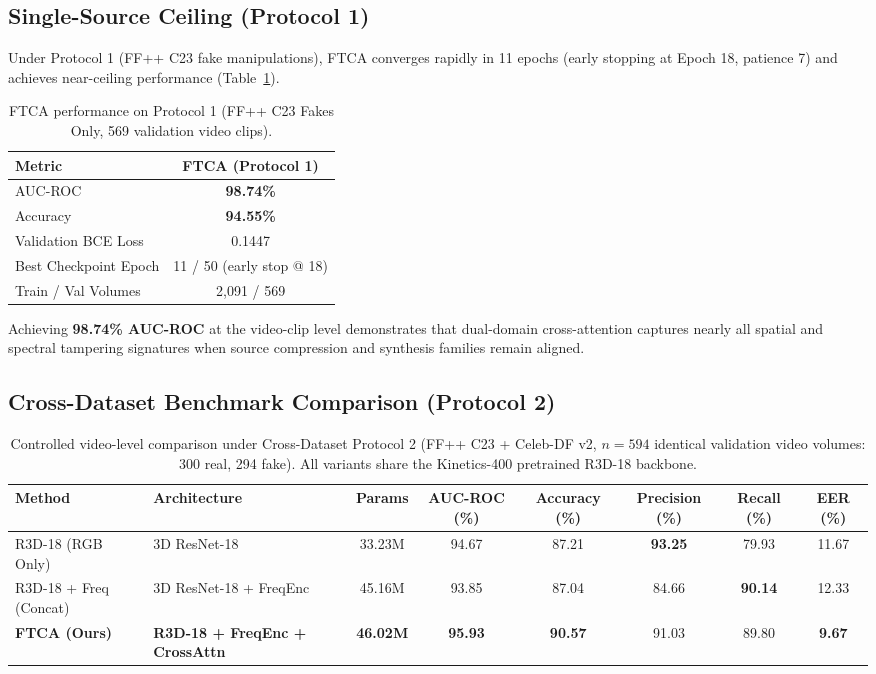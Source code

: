 \documentclass[conference,10pt]{IEEEtran}
\begin{document}
\subsection{Single-Source Ceiling (Protocol 1)}
Under Protocol 1 (FF++ C23 fake manipulations), FTCA converges rapidly in 11 epochs (early stopping at Epoch 18, patience 7) and achieves near-ceiling performance (Table~\ref{tab:single}).

\begin{table}[h]
\centering
\caption{FTCA performance on Protocol 1 (FF++ C23 Fakes Only, 569 validation video clips).}
\label{tab:single}
\begin{tabular}{lc}
\toprule
\textbf{Metric} & \textbf{FTCA (Protocol 1)} \\
\midrule
AUC-ROC & \textbf{98.74\%} \\
Accuracy & \textbf{94.55\%} \\
Validation BCE Loss & 0.1447 \\
Best Checkpoint Epoch & 11 / 50 (early stop @ 18) \\
Train / Val Volumes & 2,091 / 569 \\
\bottomrule
\end{tabular}
\end{table}

\noindent Achieving \textbf{98.74\% AUC-ROC} at the video-clip level demonstrates that dual-domain cross-attention captures nearly all spatial and spectral tampering signatures when source compression and synthesis families remain aligned.

\subsection{Cross-Dataset Benchmark Comparison (Protocol 2)}

\begin{table}[t]
\centering
\caption{Controlled video-level comparison under Cross-Dataset Protocol 2 (FF++ C23 + Celeb-DF v2, $n=594$ identical validation video volumes: 300 real, 294 fake). All variants share the Kinetics-400 pretrained R3D-18 backbone.}
\label{tab:cross}
{\setlength{\tabcolsep}{4.5pt}
\begin{tabular}{llcccccc}
\toprule
\textbf{Method} & \textbf{Architecture} & \textbf{Params} & \textbf{AUC-ROC (\%)} & \textbf{Accuracy (\%)} & \textbf{Precision (\%)} & \textbf{Recall (\%)} & \textbf{EER (\%)} \\
\midrule
R3D-18 (RGB Only) & 3D ResNet-18 & 33.23M & 94.67 & 87.21 & \textbf{93.25} & 79.93 & 11.67 \\
R3D-18 + Freq (Concat) & 3D ResNet-18 + FreqEnc & 45.16M & 93.85 & 87.04 & 84.66 & \textbf{90.14} & 12.33 \\
\textbf{FTCA (Ours)} & \textbf{R3D-18 + FreqEnc + CrossAttn} & \textbf{46.02M} & \textbf{95.93} & \textbf{90.57} & 91.03 & 89.80 & \textbf{9.67} \\
\bottomrule
\end{tabular}}
\end{table}
\end{document}
